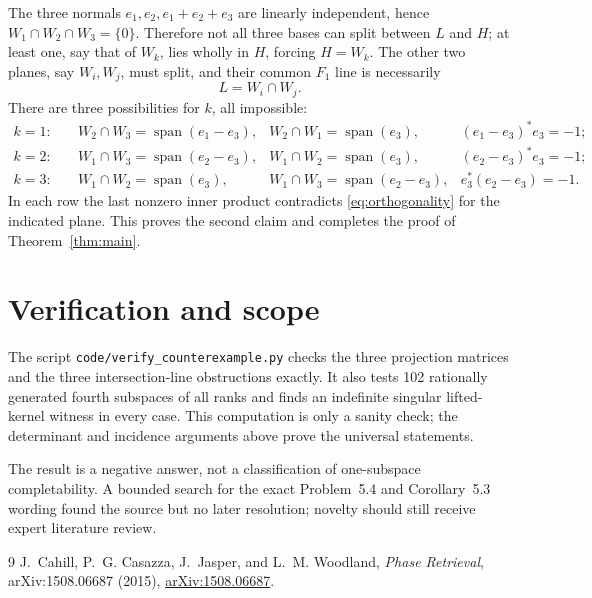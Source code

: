 \documentclass[11pt]{article}
\newcommand{\spn}{\operatorname{span}}
\begin{document}
The three normals $e_1,e_2,e_1+e_2+e_3$ are linearly independent, hence
$W_1\cap W_2\cap W_3=\{0\}$.  Therefore not all three bases can split between
$L$ and $H$; at least one, say that of $W_k$, lies wholly in $H$, forcing
$H=W_k$.  The other two planes, say $W_i,W_j$, must split, and their common
$F_1$ line is necessarily
\[
 L=W_i\cap W_j.
\]
There are three possibilities for $k$, all impossible:
\begin{align*}
 k=1:&\quad W_2\cap W_3=\spn(e_1-e_3),
       &W_2\cap W_1=\spn(e_3),
       &(e_1-e_3)^*e_3=-1;\\
 k=2:&\quad W_1\cap W_3=\spn(e_2-e_3),
       &W_1\cap W_2=\spn(e_3),
       &(e_2-e_3)^*e_3=-1;\\
 k=3:&\quad W_1\cap W_2=\spn(e_3),
       &W_1\cap W_3=\spn(e_2-e_3),
       &e_3^*(e_2-e_3)=-1.
\end{align*}
In each row the last nonzero inner product contradicts
\eqref{eq:orthogonality} for the indicated plane.  This proves the second
claim and completes the proof of Theorem~\ref{thm:main}.

\section*{Verification and scope}

The script \texttt{code/verify\_counterexample.py} checks the three projection
matrices and the three intersection-line obstructions exactly.  It also tests
102 rationally generated fourth subspaces of all ranks and finds an
indefinite singular lifted-kernel witness in every case.  This computation is
only a sanity check; the determinant and incidence arguments above prove the
universal statements.

The result is a negative answer, not a classification of one-subspace
completability.  A bounded search for the exact Problem~5.4 and Corollary~5.3
wording found the source but no later resolution; novelty should still receive
expert literature review.

\begin{thebibliography}{9}
J.~Cahill, P.~G. Casazza, J.~Jasper, and L.~M. Woodland,
\emph{Phase Retrieval},
arXiv:1508.06687 (2015),
\href{https://arxiv.org/abs/1508.06687}{arXiv:1508.06687}.
\end{thebibliography}
\end{document}
